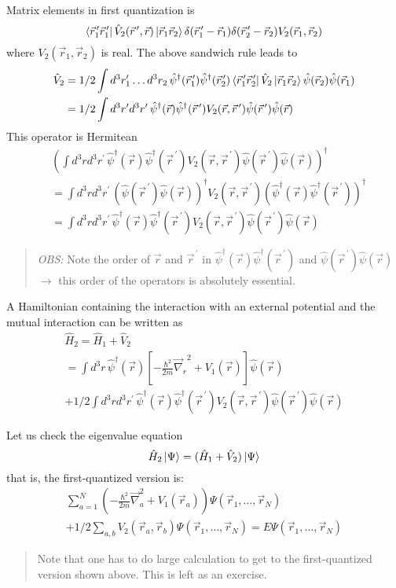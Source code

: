\documentclass[12pt]{article}
\newcommand{\be}{\begin{equation}}
\newcommand{\ee}{\end{equation}}
\newcommand{\vecrp}{\ensuremath{\vec{r}^{\,\prime}}}
\newcommand{\vecnr}{\ensuremath{\vec{\nabla}_{\!r}}}
\begin{document}
Matrix elements in first quantization is
\be
\bra{\vec{r}_1^{\,\prime} \vec{r}_1^{\,\prime}} \hat{V}_2(\vecrp,\vec{r})\ket{\vec{r}_1 \vec{r}_2}
\delta(\vec{r}_1^{\,\prime} - \vec{r}_1)\delta(\vec{r}_2^{\,\prime} - \vec{r}_2) V_2(\vec{r}_1, \vec{r}_2)
\ee 
where $V_2(\vec{r}_1, \vec{r}_2)$ is real. 
The above sandwich rule leads to
\be
\begin{aligned}
\hat{V}_2 
&= 1/2 \int d^3r_1^\prime\ldots d^3r_2\,
\hat{\psi}^\dagger(\vec{r}_1^{\,\prime})\hat{\psi}^\dagger(\vec{r}_2^{\,\prime}) 
\bra{\vec{r}_1^{\,\prime} \vec{r}_2^{\,\prime}} \hat{V}_2\ket{\vec{r}_1 \vec{r}_2}
\hat{\psi}(\vec{r}_2)\hat{\psi}(\vec{r}_1)\\
&= 1/2 \int d^3r^\prime d^3r^\prime\,
\hat{\psi}^\dagger(\vec{r})\hat{\psi}^\dagger(\vecrp) 
V_2(\vec{r},\vecrp)
\hat{\psi}(\vecrp)\hat{\psi}(\vec{r})
\end{aligned}
\ee
%
This operator is Hermitean
\be
\begin{aligned}
&\left(\int d^3r d^3r^\prime\,
\hat{\psi}^\dagger(\vec{r})\hat{\psi}^\dagger(\vecrp) 
V_2(\vec{r},\vecrp)
\hat{\psi}(\vecrp)\hat{\psi}(\vec{r})\right)^\dagger\\
&= \int d^3r d^3r^\prime\,
\left(\hat{\psi}(\vecrp)\hat{\psi}(\vec{r})\right)^\dagger
V_2(\vec{r},\vecrp)
\left(\hat{\psi}^\dagger(\vec{r})\hat{\psi}^\dagger(\vecrp)\right)^\dagger\\
&=\int d^3r d^3r^\prime\,
\hat{\psi}^\dagger(\vec{r})\hat{\psi}^\dagger(\vecrp) 
V_2(\vec{r},\vecrp)
\hat{\psi}(\vecrp)\hat{\psi}(\vec{r})
\end{aligned}
\ee
\begin{quote}
\emph{OBS:} Note the order of $\vec{r}$ and $\vecrp$ in $\hat{\psi}^\dagger(\vec{r})\hat{\psi}^\dagger(\vecrp)$
and $\hat{\psi}(\vecrp)\hat{\psi}(\vec{r})$ $\to$ this order of the
operators is absolutely essential.
\end{quote}
A Hamiltonian containing the interaction with
an external potential and the mutual interaction
can be written as
\be
\begin{gathered}
\hat{H}_2 = \hat{H}_1 + \hat{V}_2 \\
= 
\int d^3r\,
\hat{\psi}^\dagger(\vec{r})
\left[
-\frac{\hbar^2}{2m}\vecnr^2 + V_1(\vec{r}) 
\right]\hat{\psi}(\vec{r})
\\
+1/2 \int d^3r d^3r^\prime\,
\hat{\psi}^\dagger(\vec{r})\hat{\psi}^\dagger(\vecrp) 
V_2(\vec{r},\vecrp)
\hat{\psi}(\vecrp)\hat{\psi}(\vec{r})
\end{gathered}
\ee

Let us check the eigenvalue equation
\[
\hat{H}_2 \ket{\Psi} = (\hat{H}_1 + \hat{V}_2)\ket{\Psi}
\]
that is, the first-quantized version is:
\[
\begin{gathered}
\sum_{a=1}^{N} \left(
-\frac{\hbar^{2}}{2 m} \vec{\nabla}_{a}^{2}+V_{1}\left(\vec{r}_{a}\right)\right) 
\Psi\left(\vec{r}_{1}, \ldots, \vec{r}_{N}
\right)\\
+1 / 2 \sum_{a, b} V_{2}\left(\vec{r}_{a}, \vec{r}_{b}\right) \Psi\left(\vec{r}_{1}, \ldots, \vec{r}_{N}\right) 
= E \Psi\left(\vec{r}_{1}, \ldots, \vec{r}_{N}\right)
\end{gathered}
\]

\begin{quote}
Note that one has to do large calculation to get to the first-quantized version shown above. 
This is left as an exercise.
\end{quote}
\end{document}
